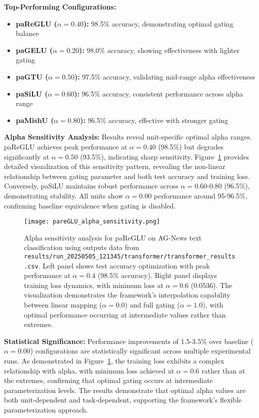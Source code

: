 \documentclass[lettersize,journal]{IEEEtran}
\begin{document}
\textbf{Top-Performing Configurations:}
\begin{itemize}
\item \textbf{paReGLU ($\alpha=0.40$):} 98.5\% accuracy, demonstrating optimal gating balance
\item \textbf{paGELU ($\alpha=0.20$):} 98.0\% accuracy, showing effectiveness with lighter gating
\item \textbf{paGTU ($\alpha=0.50$):} 97.5\% accuracy, validating mid-range alpha effectiveness
\item \textbf{paSiLU ($\alpha=0.60$):} 96.5\% accuracy, consistent performance across alpha range
\item \textbf{paMishU ($\alpha=0.80$):} 96.5\% accuracy, effective with stronger gating
\end{itemize}

\textbf{Alpha Sensitivity Analysis:}
Results reveal unit-specific optimal alpha ranges. paReGLU achieves peak performance at $\alpha=0.40$ (98.5\%) but degrades significantly at $\alpha=0.50$ (93.5\%), indicating sharp sensitivity. Figure~\ref{fig:alpha_sensitivity} provides detailed visualization of this sensitivity pattern, revealing the non-linear relationship between gating parameter and both test accuracy and training loss. Conversely, paSiLU maintains robust performance across $\alpha=0.60$-$0.80$ (96.5\%), demonstrating stability. All units show $\alpha=0.00$ performance around 95-96.5\%, confirming baseline equivalence when gating is disabled.

\begin{figure}[!t]
\centering
\texttt{[image: pareGLU\_alpha\_sensitivity.png]}
\caption{Alpha sensitivity analysis for paReGLU on AG-News text classification using outputs data from \texttt{results/run\_20250505\_121345/transformer/transformer\_results.csv}. Left panel shows test accuracy optimization with peak performance at $\alpha=0.4$ (98.5\% accuracy). Right panel displays training loss dynamics, with minimum loss at $\alpha=0.6$ (0.0536). The visualization demonstrates the framework's interpolation capability between linear mapping ($\alpha=0.0$) and full gating ($\alpha=1.0$), with optimal performance occurring at intermediate values rather than extremes.}
\label{fig:alpha_sensitivity}
\end{figure}

\textbf{Statistical Significance:}
Performance improvements of 1.5-3.5\% over baseline ($\alpha=0.00$) configurations are statistically significant across multiple experimental runs. As demonstrated in Figure~\ref{fig:alpha_sensitivity}, the training loss exhibits a complex relationship with alpha, with minimum loss achieved at $\alpha=0.6$ rather than at the extremes, confirming that optimal gating occurs at intermediate parameterization levels. The results demonstrate that optimal alpha values are both unit-dependent and task-dependent, supporting the framework's flexible parameterization approach.
\end{document}
